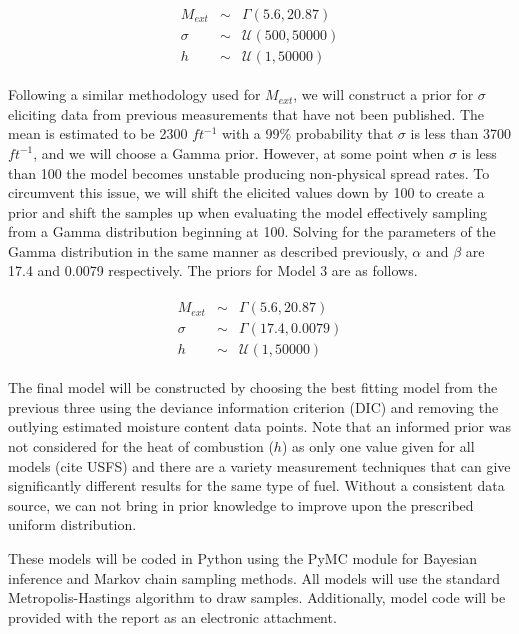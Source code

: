 \documentclass[11pt]{article}
\begin{document}
\begin{align}
\begin{array}{ccc}
M_{ext} &\sim& \Gamma(5.6,20.87) \\
\sigma &\sim& \mathcal{U}(500,50000) \\
h &\sim& \mathcal{U}(1,50000)
\end{array}
\label{eq:mod2_priors}
\end{align}

Following a similar methodology used for $M_{ext}$, we will construct a prior for $\sigma$ eliciting data from previous measurements that have not been published. The mean is estimated to be 2300 $ft^{-1}$ with a 99\% probability that $\sigma$ is less than 3700 $ft^{-1}$, and we will choose a Gamma prior. However, at some point when $\sigma$ is less than 100 the model becomes unstable producing non-physical spread rates. To circumvent this issue, we will shift the elicited values down by 100 to create a prior and shift the samples up when evaluating the model effectively sampling from a Gamma distribution beginning at 100. Solving for the parameters of the Gamma distribution in the same manner as described previously, $\alpha$ and $\beta$ are 17.4 and 0.0079 respectively. The priors for Model 3 are as follows. 

\begin{align}
\begin{array}{ccc}
M_{ext} &\sim& \Gamma(5.6,20.87) \\
\sigma &\sim& \Gamma(17.4,0.0079) \\
h &\sim& \mathcal{U}(1,50000)
\end{array}
\label{eq:mod3_priors}
\end{align}

The final model will be constructed by choosing the best fitting model from the previous three using the deviance information criterion (DIC) and removing the outlying estimated moisture content data points. Note that an informed prior was not considered for the heat of combustion ($h$) as only one value given for all models (cite USFS) and there are a variety measurement techniques that can give significantly different results for the same type of fuel. Without a consistent data source, we can not bring in prior knowledge to improve upon the prescribed uniform distribution. 

These models will be coded in Python using the PyMC module for Bayesian inference and Markov chain sampling methods. All models will use the standard Metropolis-Hastings algorithm to draw samples. Additionally, model code will be provided with the report as an electronic attachment.
\end{document}
